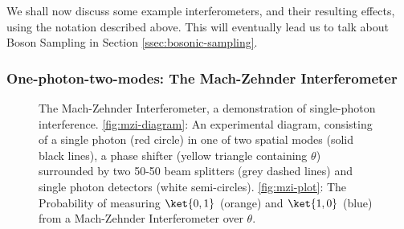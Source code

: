 We shall now discuss some example interferometers, and their resulting effects, using the notation described above. This will eventually lead us to talk about Boson Sampling in Section \ref{ssec:bosonic-sampling}.

\subsubsection{One-photon-two-modes: The Mach-Zehnder Interferometer}

\begin{figure}
\hfill
{}
\caption[Experimental setup of the Mach-Zehnder Interferometer and probability of outcomes over phase $\theta$]{\label{fig:mzi}The Mach-Zehnder Interferometer, a demonstration of single-photon interference. \ref{fig:mzi-diagram}: An experimental diagram, consisting of a single photon (red circle) in one of two spatial modes (solid black lines), a phase shifter (yellow triangle containing $\theta$) surrounded by two 50-50 beam splitters (grey dashed lines) and single photon detectors (white semi-circles). \ref{fig:mzi-plot}: The Probability of measuring $\ket{0,1}$ (orange) and $\ket{1,0}$ (blue) from a Mach-Zehnder Interferometer over $\theta$.}
\end{figure}

